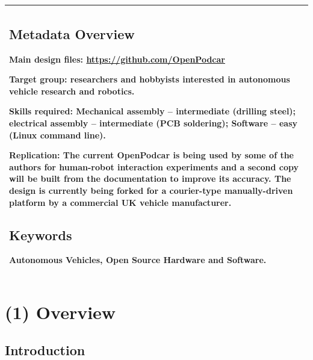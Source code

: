 \documentclass[a4paper]{article}
\begin{document}
	\begin{longtable}[]{@{}l@{}}
		\begin{minipage}[t]{0.97\columnwidth}\raggedright\strut
			
			
			
			\subsection*{Metadata Overview}\label{h.akaipbqoqfs8}
			
			Main design files: \url{https://github.com/OpenPodcar}
			
			Target group: researchers and hobbyists interested in autonomous vehicle research and robotics. 
			
			Skills required: Mechanical assembly – intermediate (drilling steel); electrical assembly – intermediate (PCB soldering); Software – easy (Linux command line).
			
			Replication: The current OpenPodcar is being used by some of the authors for human-robot interaction experiments and a second copy will be built from the documentation to improve its accuracy. The design is currently being forked for a courier-type manually-driven platform by a commercial UK vehicle manufacturer. 
			
			
			
			\subsection*{Keywords}\label{h.kdz351yp7g7c}
			
			{Autonomous Vehicles, Open Source Hardware and Software.}
			
			\strut\end{minipage}\tabularnewline
		\bottomrule
	\end{longtable}
	
	
	
	\section{(1) Overview}
	
	\subsection{Introduction}
	\label{h.pnj38xyr5dyy}
	
	
	
\end{document}
